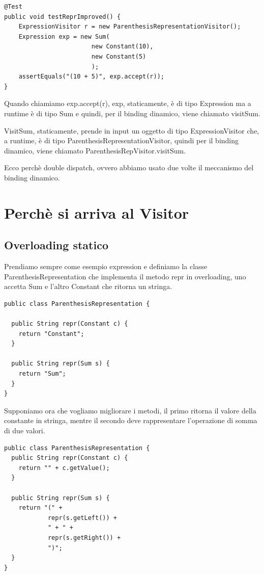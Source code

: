 \begin{lstlisting}
@Test
public void testReprImproved() {
    ExpressionVisitor r = new ParenthesisRepresentationVisitor();
    Expression exp = new Sum(
                        new Constant(10),
                        new Constant(5)
                        );
    assertEquals("(10 + 5)", exp.accept(r));
}
\end{lstlisting}

Quando chiamiamo exp.accept(r), exp, staticamente, è di tipo Expression ma a runtime è di tipo Sum e quindi, per il binding dinamico, viene chiamato visitSum.

VisitSum, staticamente, prende in input un oggetto di tipo ExpressionVisitor che, a runtime, è di tipo ParenthesisRepresentationVisitor, quindi per il binding dinamico, 
viene chiamato ParenthesisRepVisitor.visitSum.

Ecco perchè double dispatch, ovvero abbiamo usato due volte il meccanismo del binding dinamico.

\section{Perchè si arriva al Visitor}

\subsection{Overloading statico}
Prendiamo sempre come esempio expression e definiamo la classe ParenthesisRepresentation che implementa il metodo repr in overloading, uno accetta Sum e l'altro 
Constant che ritorna un stringa.
\begin{lstlisting}
public class ParenthesisRepresentation {
  
  public String repr(Constant c) {
    return "Constant";
  }
  
  public String repr(Sum s) {
    return "Sum";
  }
}   
\end{lstlisting}

Supponiamo ora che vogliamo migliorare i metodi, il primo ritorna il valore della constante in stringa, mentre il secondo deve rappresentare l'operazione di 
somma di due valori.
\begin{lstlisting}
public class ParenthesisRepresentation {
  public String repr(Constant c) {
    return "" + c.getValue();
  }

  public String repr(Sum s) {
    return "(" +
            repr(s.getLeft()) +
            " + " +
            repr(s.getRight()) +
            ")";
  }
}
\end{lstlisting}

